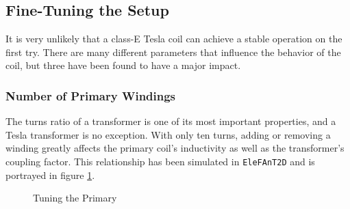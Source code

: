 \subsection{Fine-Tuning the Setup} %

It is very unlikely that a class-E Tesla coil can achieve a stable operation on the first try. There are many different parameters that influence the behavior of the coil, but three have been found to have a major impact.

\subsubsection{Number of Primary Windings}

The turns ratio of a transformer is one of its most important properties, and a Tesla transformer is no exception. With only ten turns, adding or removing a winding greatly affects the primary coil's inductivity as well as the transformer's coupling factor. This relationship has been simulated in \texttt{EleFAnT2D} and is portrayed in figure \ref{fig:tuning-the-primary}.

\begin{figure}[h!]
    \centering
    \caption{Tuning the Primary}
    \label{fig:tuning-the-primary}
\end{figure}

